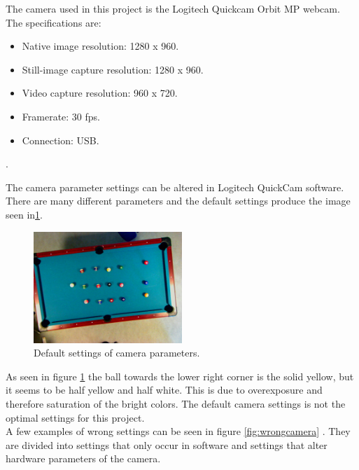The camera used in this project is the Logitech Quickcam Orbit MP webcam. The specifications are:

\begin{itemize}
\setlength{\itemsep}{0mm}
	\item Native image resolution: 1280 x 960.
	\item Still-image capture resolution: 1280 x 960.
	\item Video capture resolution: 960 x 720.
	\item Framerate: 30 fps.
	\item Connection: USB.
\end{itemize}.

The camera parameter settings can be altered in Logitech QuickCam software. There are many different parameters and the default settings produce the image seen in\ref{fig:defaultcamera}.

\begin{figure}[H]
\begin{center}
\leavevmode
\includegraphics[width=0.5\textwidth]{images/default}
\end{center}
\caption{Default settings of camera parameters.}
\label{fig:defaultcamera}
\end{figure} 
	
As seen in figure \ref{fig:defaultcamera} the ball towards the lower right corner is the solid yellow, but it seems to be half yellow and half white. This is due to overexposure and therefore saturation of the bright colors. The default camera settings is not the optimal settings for this project.\\	

A few examples of wrong settings can be seen in figure \ref{fig:wrongcamera} . They are divided into settings that only occur in software and settings that alter hardware parameters of the camera.

